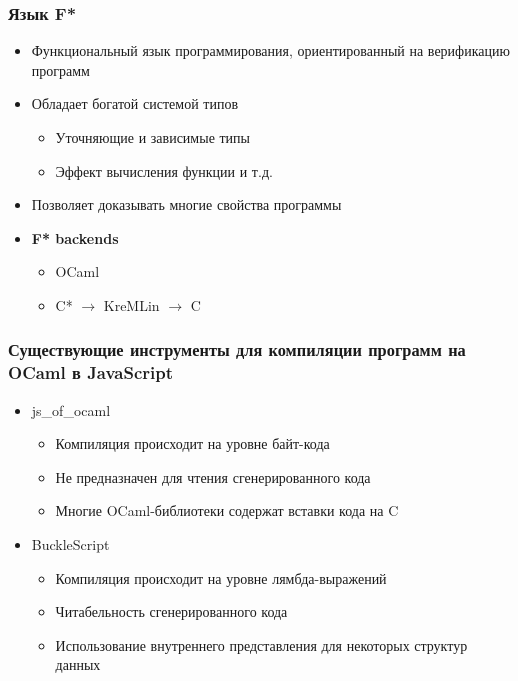 \documentclass{beamer}
\begin{document}
\begin{frame}
\transwipe[direction=90]
\frametitle{Язык F*}

\begin{itemize}
\item Функциональный язык программирования, ориентированный на верификацию программ
\item Обладает богатой системой типов
	\begin{itemize}
	\item Уточняющие и зависимые типы
	\item Эффект вычисления функции и т.д.
	\end{itemize}
\item Позволяет доказывать многие свойства программы
\item \textbf{F* backends}
	\begin{itemize}
	\item OCaml
	\item C* $\to$ KreMLin $\to$ C
	\end{itemize}
\end{itemize}

\end{frame}

\begin{frame}
\transwipe[direction=90]
\frametitle{Существующие инструменты для компиляции программ на OCaml в JavaScript}

\begin{itemize}
\item js\_of\_ocaml
	\begin{itemize}
	\item Компиляция происходит на уровне байт-кода
	\item Не предназначен для чтения сгенерированного кода 
	\item Многие OCaml-библиотеки содержат вставки кода на C
	\end{itemize}
\item BuckleScript
	\begin{itemize}
	\item Компиляция происходит на уровне лямбда-выражений
	\item Читабельность сгенерированного кода
	\item Использование внутреннего представления для некоторых структур данных
	\end{itemize}	
\end{itemize}

\end{frame}
\end{document}
